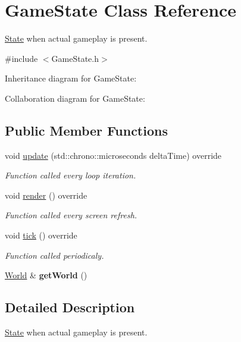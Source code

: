 \hypertarget{classGameState}{\section{Game\-State Class Reference}
\label{classGameState}
}


\hyperlink{classState}{State} when actual gameplay is present.  




{\ttfamily \#include $<$Game\-State.\-h$>$}



Inheritance diagram for Game\-State\-:


Collaboration diagram for Game\-State\-:
\subsection*{Public Member Functions}
\begin{DoxyCompactItemize}
\item 
void \hyperlink{classGameState_aba059d7ab1a53b8f5d795292ed37abac}{update} (std\-::chrono\-::microseconds delta\-Time) override
\begin{DoxyCompactList}\small\item\em Function called every loop iteration. \end{DoxyCompactList}\item 
void \hyperlink{classGameState_a2c36ada0cae89f91d956e2c91b070893}{render} () override
\begin{DoxyCompactList}\small\item\em Function called every screen refresh. \end{DoxyCompactList}\item 
void \hyperlink{classGameState_ae9ff24d75f36ef56daa6a180d4b38a09}{tick} () override
\begin{DoxyCompactList}\small\item\em Function called periodicaly. \end{DoxyCompactList}\item 
\hypertarget{classGameState_aebc076f9bcec0aa4317eff9e9a8d566e}{\hyperlink{classWorld}{World} \& {\bfseries get\-World} ()}\label{classGameState_aebc076f9bcec0aa4317eff9e9a8d566e}

\end{DoxyCompactItemize}


\subsection{Detailed Description}
\hyperlink{classState}{State} when actual gameplay is present. 

